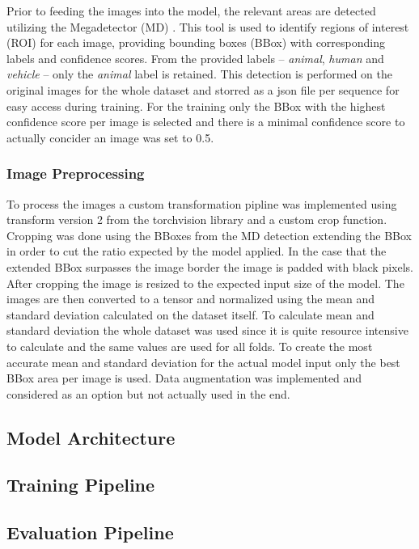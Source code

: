         Prior to feeding the images into the model, the relevant areas are detected utilizing the Megadetector (MD) \autocite{morrisEfficientPipelineCamera2025}. 
        This tool is used to identify regions of interest (ROI) for each image, providing bounding boxes (BBox) with corresponding labels and confidence scores.
        From the provided labels -- \textit{animal}, \textit{human} and \textit{vehicle} -- only the \textit{animal} label is retained.
        This detection is performed on the original images for the whole dataset and storred as a json file per sequence for easy access during training.
        For the training only the BBox with the highest confidence score per image is selected and there is a minimal confidence score to actually concider an image was set to 0.5.
        

        \subsubsection{Image Preprocessing}
        To process the images a custom transformation pipline was implemented using transform version 2 from the torchvision library and a custom crop function.
        Cropping was done using the BBoxes from the MD detection extending the BBox in order to cut the ratio expected by the model applied.
        In the case that the extended BBox surpasses the image border the image is padded with black pixels.
        After cropping the image is resized to the expected input size of the model.
        The images are then converted to a tensor and normalized using the mean and standard deviation calculated on the dataset itself.
        To calculate mean and standard deviation the whole dataset was used since it is quite resource intensive to calculate and the same values are used for all folds.
        To create the most accurate mean and standard deviation for the actual model input only the best BBox area per image is used.
        Data augmentation was implemented and considered as an option but not actually used in the end.

        \subsection{Model Architecture}

        \subsection{Training Pipeline}

        \subsection{Evaluation Pipeline}
